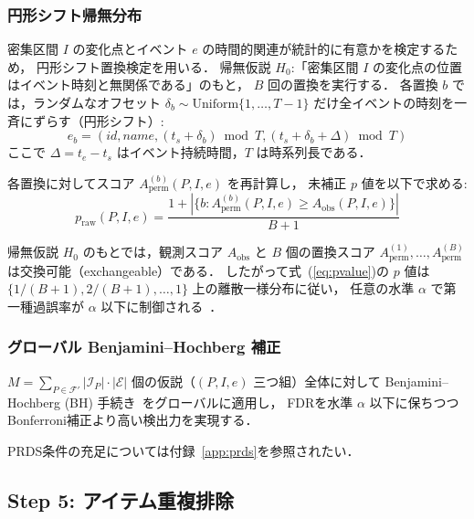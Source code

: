 \subsubsection{円形シフト帰無分布}

密集区間 $I$ の変化点とイベント $e$ の時間的関連が統計的に有意かを検定するため，
円形シフト置換検定を用いる．
帰無仮説 $H_0$:「密集区間 $I$ の変化点の位置はイベント時刻と無関係である」のもと，
$B$ 回の置換を実行する．
各置換 $b$ では，ランダムなオフセット $\delta_b \sim \text{Uniform}\{1, \ldots, T-1\}$
だけ全イベントの時刻を一斉にずらす（円形シフト）:
\begin{equation}
e_b = (\textit{id}, \textit{name}, (t_s + \delta_b) \bmod T, (t_s + \delta_b + \Delta) \bmod T)
\end{equation}
ここで $\Delta = t_e - t_s$ はイベント持続時間，$T$ は時系列長である．

各置換に対してスコア $A_{\text{perm}}^{(b)}(P, I, e)$ を再計算し，
未補正 $p$ 値を以下で求める:
\begin{equation}
p_{\text{raw}}(P, I, e) = \frac{1 + |\{b : A_{\text{perm}}^{(b)}(P, I, e) \geq A_{\text{obs}}(P, I, e)\}|}{B + 1}
\label{eq:pvalue}
\end{equation}

\begin{proposition}[置換検定の正当性]\label{prop:perm_exact}
帰無仮説 $H_0$ のもとでは，観測スコア $A_{\text{obs}}$ と
$B$ 個の置換スコア $A_{\text{perm}}^{(1)}, \ldots, A_{\text{perm}}^{(B)}$ は交換可能（exchangeable）である．
したがって式~(\ref{eq:pvalue})の $p$ 値は
$\{1/(B+1), 2/(B+1), \ldots, 1\}$ 上の離散一様分布に従い，
任意の水準 $\alpha$ で第一種過誤率が $\alpha$ 以下に制御される~\cite{davison1997bootstrap}．
\end{proposition}

\subsubsection{グローバル Benjamini--Hochberg 補正}

$M = \sum_{P \in \mathcal{F}'} |\mathcal{I}_P| \cdot |\mathcal{E}|$
個の仮説（$(P, I, e)$ 三つ組）全体に対して
Benjamini--Hochberg (BH) 手続き~\cite{benjamini1995controlling}をグローバルに適用し，
FDRを水準 $\alpha$ 以下に保ちつつBonferroni補正より高い検出力を実現する．

PRDS条件の充足については付録~\ref{app:prds}を参照されたい．

\subsection{Step 5: アイテム重複排除}\label{sec:dedup}

